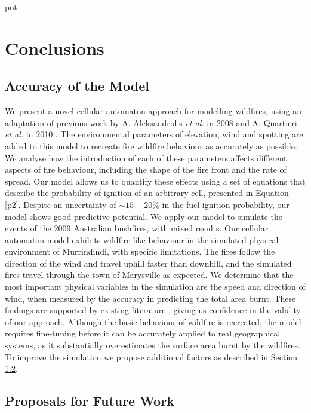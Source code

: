 pot\newpage
\section{Conclusions}\label{conclusions}

\subsection{Accuracy of the Model}

We present a novel cellular automaton approach for modelling wildfires, using an adaptation of previous work by A. Aleksandridis \textit{et al.} in 2008 \cite{Aleksandridis_2008} and A. Quartieri \textit{et al.} in 2010 \cite{Quartieri_2010}. The environmental parameters of elevation, wind and spotting are added to this model to recreate fire wildfire behaviour as accurately as possible. We analyse how the introduction of each of these parameters affects different aspects of fire behaviour, including the shape of the fire front and the rate of spread. Our model allows us to quantify these effects using a set of equations that describe the probability of ignition of an arbitrary cell, presented in Equation \ref{p2}. Despite an uncertainty of $\sim 15-20\%$ in the fuel ignition probability, our model shows good predictive potential. \newline \indent We apply our model to simulate the events of the 2009 Australian bushfires, with mixed results. Our cellular automaton model exhibits wildfire-like behaviour in the simulated physical environment of Murrindindi, with specific limitations. The fires follow the direction of the wind and travel uphill faster than downhill, and the simulated fires travel through the town of Marysville as expected. We determine that the most important physical variables in the simulation are the speed and direction of wind, when measured by the accuracy in predicting the total area burnt. These findings are supported by existing literature \cite{Xuehua_2016, Freire_2019}, giving us confidence in the validity of our approach. Although the basic behaviour of wildfire is recreated, the model requires fine-tuning before it can be accurately applied to real geographical systems, as it substantially overestimates the surface area burnt by the wildfires. To improve the simulation we propose additional factors as described in Section \ref{furtherwork}.

\subsection{Proposals for Future Work}\label{furtherwork}

